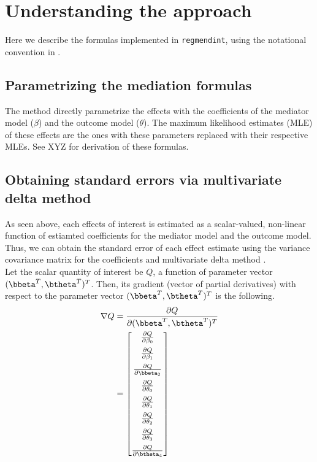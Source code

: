 \documentclass[dvipdfmx,10pt]{article}
\begin{document}
\section{Understanding the approach}
\label{sec:org122f228}
Here we describe the formulas implemented in \texttt{regmendint}, using the notational convention in \cite{vanderweeleExplanationCausalInference2015,valeriMediationAnalysisAllowing2013,valeriSASMacroCausal2015}.

\subsection{Parametrizing the mediation formulas}
\label{sec:org785e882}
The method directly parametrize the effects with the coefficients of the mediator model (\(\beta\)) and the outcome model (\(\theta\)). The maximum likelihood estimates (MLE) of these effects are the ones with these parameters replaced with their respective MLEs. See XYZ for derivation of these formulas.\\

\subsection{Obtaining standard errors via multivariate delta method}
\label{sec:org4a7c00b}

As seen above, each effects of interest is estimated as a scalar-valued, non-linear function of estiamted coefficients for the mediator model and the outcome model. Thus, we can obtain the standard error of each effect estimate using the variance covariance matrix for the coefficients and multivariate delta method \cite{hoefWhoInventedDelta2012}.\\

Let the scalar quantity of interest be \(Q\), a function of parameter vector \((\bbeta^{T},\btheta^{T})^{T}\). Then, its gradient (vector of partial derivatives) with respect to the parameter vector \((\bbeta^{T},\btheta^{T})^{T}\) is the following.\\

\begin{align*}
\nabla Q &= \frac{\partial Q}{\partial (\bbeta^{T},\btheta^{T})^{T}}\\
         &= \begin{bmatrix}
           \frac{\partial Q}{\partial \beta_{0}}\\[6pt]
           \frac{\partial Q}{\partial \beta_{1}}\\[6pt]
           \frac{\partial Q}{\partial \bbeta_{2}}\\[6pt]
           \frac{\partial Q}{\partial \theta_{0}}\\[6pt]
           \frac{\partial Q}{\partial \theta_{1}}\\[6pt]
           \frac{\partial Q}{\partial \theta_{2}}\\[6pt]
           \frac{\partial Q}{\partial \theta_{3}}\\[6pt]
           \frac{\partial Q}{\partial \btheta_{4}}\\
         \end{bmatrix}\\
\end{align*}
\end{document}
